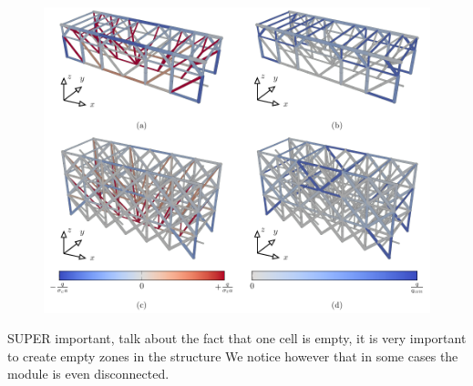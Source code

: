\begin{figure}
    \centering
    \includegraphics[width=\linewidth]{figures/05_cellular_opt/00_multiple_failure/mul_mech.pdf}
    \caption{}
    \label{fig:05}
\end{figure}
SUPER important, talk about the fact that one cell is empty, it is very important to create empty zones in the structure
We notice however that in some cases the module is even disconnected.
